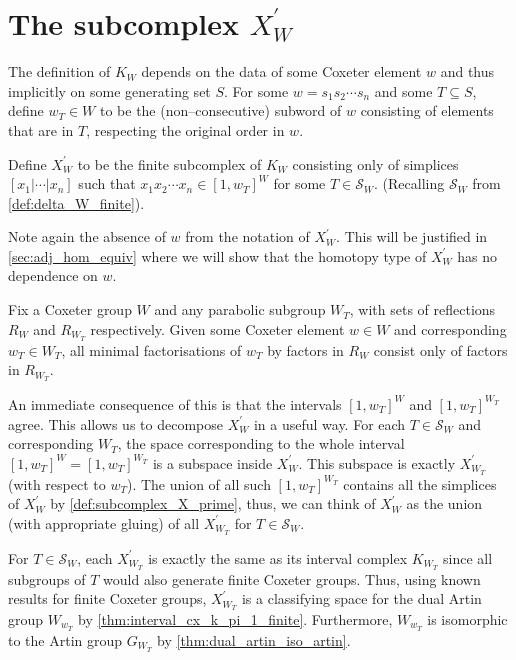\documentclass[class=article, crop=false]{standalone}
\begin{document}
\section{The subcomplex \texorpdfstring{$X_{W}^\prime$}{X W Prime}}
The definition of $K_{W}$ depends on the data of some Coxeter element $w$ and thus implicitly on some generating set $S$. For some $w = s_1s_2\cdots s_n$ and some $T\subseteq S$, define $w_T\in W$ to be the (non--consecutive) subword of $w$ consisting of elements that are in $T$, respecting the original order in $w$. 
\begin{definition}
    Define $X_{W}^\prime$ to be the finite subcomplex of $K_{W}$ consisting only of simplices $[x_1 | \cdots | x_n]$ such that $x_1x_2\cdots x_n \in [1,w_T]^W$ for some $T \in \mathcal{S}_W$. (Recalling $\mathcal{S}_W$ from \cref{def:delta_W_finite}).
    \label{def:subcomplex_X_prime}
\end{definition}
Note again the absence of $w$ from the notation of $X^\prime_W$. This will be justified in \cref{sec:adj_hom_equiv} where we will show that the homotopy type of $X_W^\prime$ has no dependence on $w$.

\begin{lemma}[{\hspace{1sp}\cite[Lemma 5.2]{paolini_salvetti_kpi1_2021}}]
    Fix a Coxeter group $W$ and any parabolic subgroup $W_T$, with sets of reflections $R_W$ and $R_{W_T}$ respectively. Given some Coxeter element $w \in W$ and corresponding $w_T \in W_T$, all minimal factorisations of $w_T$ by factors in $R_W$ consist only of factors in $R_{W_T}$.
    \label{lem:all_decompositions_of_w_T_are_R}
\end{lemma}
An immediate consequence of this is that the intervals $[1,w_T]^W$ and $[1,w_T]^{W_T}$ agree. This allows us to decompose $X^\prime_W$ in a useful way. For each $T \in \mathcal{S}_W$ and corresponding $W_T$, the space corresponding to the whole interval $[1, w_T]^W=[1,w_T]^{W_T}$ is a subspace inside $X^\prime_W$. This subspace is exactly $X^\prime_{W_T}$ (with respect to $w_T$). The union of all such $[1,w_T]^{W_T}$ contains all the simplices of $X_W^\prime$ by \cref{def:subcomplex_X_prime}, thus, we can think of $X^\prime_W$ as the union (with appropriate gluing) of all $X^\prime_{W_T}$ for $T \in \mathcal{S}_W$.

For $T \in \mathcal{S}_W$, each $X^\prime_{W_T}$ is exactly the same as its interval complex $K_{{W_T}}$ since all subgroups of $T$ would also generate finite Coxeter groups. Thus, using known results for finite Coxeter groups, $X^\prime_{W_T}$ is a classifying space for the dual Artin group $W_{w_T}$ by \cref{thm:interval_cx_k_pi_1_finite}. Furthermore, $W_{w_T}$ is isomorphic to the Artin group $G_{W_T}$ by \cref{thm:dual_artin_iso_artin}.
\end{document}
